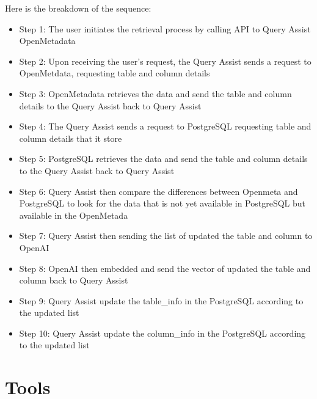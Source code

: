 Here is the breakdown of the sequence:
\begin{itemize}
    \item  Step 1: The user initiates the retrieval process by calling API to Query Assist OpenMetadata
    \item  Step 2: Upon receiving the user's request, the Query Assist sends a request to OpenMetdata, requesting table and column details
    \item  Step 3: OpenMetadata retrieves the data and send the table and column details to the Query Assist back to Query Assist
    \item  Step 4: The Query Assist sends a request to PostgreSQL requesting table and column details that it store
    \item  Step 5: PostgreSQL retrieves the data and send the table and column details to the Query Assist back to Query Assist
    \item  Step 6: Query Assist then compare the differences between Openmeta and PostgreSQL to look for the data that is not yet available in PostgreSQL but available in the OpenMetada
    \item  Step 7: Query Assist then sending the list of updated the table and column to OpenAI
    \item  Step 8: OpenAI then embedded and send the vector of updated the table and column back to Query Assist
    \item  Step 9:  Query Assist update the table\_info in the PostgreSQL according to the updated list
    \item  Step 10: Query Assist update the column\_info in the PostgreSQL according to the updated list
\end{itemize}

\section{Tools}
